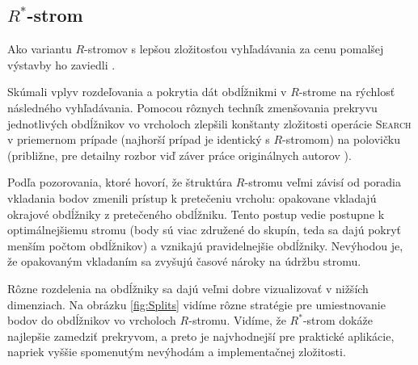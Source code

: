 \documentclass[10pt,a4paper,oneside]{article}
\begin{document}
{\subsection{$R^*$-strom}\label{rstartree}

\FloatBarrier

Ako variantu $R$-stromov s lepšou zložitosťou vyhľadávania za cenu pomalšej výstavby ho zaviedli \citet{Beckmann90}.

Skúmali vplyv rozdeľovania a pokrytia dát obdĺžnikmi v $R$-strome na rýchlosť následného vyhľadávania. Pomocou rôznych techník zmenšovania prekryvu jednotlivých obdĺžnikov vo vrcholoch zlepšili konštanty zložitosti operácie \textsc{Search} v priemernom prípade (najhorší prípad je identický s $R$-stromom) na polovičku (približne, pre detailny rozbor viď záver práce originálnych autorov \citet{Beckmann90}).

Podľa pozorovania, ktoré hovorí, že štruktúra $R$-stromu veľmi závisí od poradia vkladania bodov zmenili prístup k pretečeniu vrcholu:
opakovane vkladajú okrajové obdĺžniky z pretečeného obdĺžniku.
Tento postup vedie postupne k optimálnejšiemu stromu (body sú viac združené do skupín, teda sa dajú pokryť menším počtom obdĺžnikov) a vznikajú pravidelnejšie obdĺžniky.
Nevýhodou je, že opakovaným vkladaním sa zvyšujú časové nároky na údržbu stromu.

Rôzne rozdelenia na obdĺžniky sa dajú veľmi dobre vizualizovať v nižších dimenziach. Na obrázku \ref{fig:Splits} vidíme rôzne stratégie pre umiestnovanie bodov do obdĺžnikov vo vrcholoch $R$-stromu. Vidíme, že $R^*$-strom dokáže najlepšie zamedziť prekryvom, a preto je najvhodnejší pre praktické aplikácie, napriek vyššie spomenutým nevýhodám a implementačnej zložitosti.

}
\end{document}
